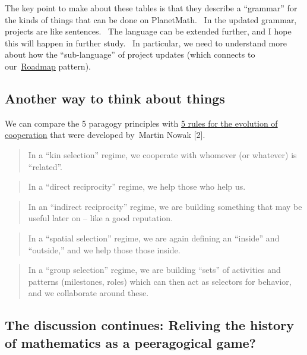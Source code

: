 The key point to make about these tables is that they describe a
``grammar'' for the kinds of things that can be done on PlanetMath.~ In
the updated grammar, projects are like sentences.~ The language can be
extended further, and I hope this will happen in further study.~ In
particular, we need to understand more about how the ``sub-language'' of
project updates (which connects to
our~\href{http://peeragogy.org/practice/roadmap/}{Roadmap} pattern).

\subsection{Another way to think about things}

We can compare the 5 paragogy
principles with
\href{http://isites.harvard.edu/fs/docs/icb.topic426436.files/five_rules.pdf}{5
rules for the evolution of cooperation} that were developed by~Martin
Nowak {[}2{]}.

\begin{quote}
In a ``kin selection'' regime, we cooperate with whomever (or
whatever) is ``related''.
\end{quote}

\begin{quote}
In a ``direct reciprocity'' regime, we help those who help us.
\end{quote}

\begin{quote}
In an ``indirect reciprocity'' regime, we are building something that
may be useful later on -- like a good reputation.
\end{quote}

\begin{quote}
In a ``spatial selection'' regime, we are again defining an ``inside''
and ``outside,'' and we help those those inside.
\end{quote}

\begin{quote}
In a ``group selection'' regime, we are building ``sets'' of
activities and patterns (milestones, roles) which can then act as
selectors for behavior, and we collaborate around these.
\end{quote}

\subsection{The discussion continues: Reliving the history of
mathematics as a peeragogical game?}

